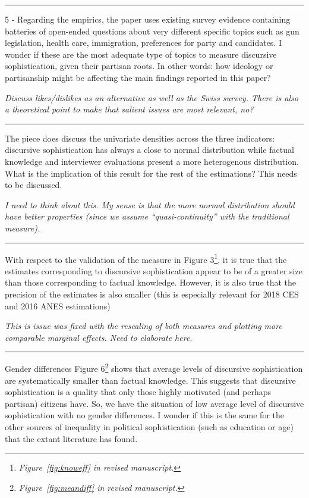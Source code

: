 \rule{\linewidth}{.01cm}

5 - Regarding the empirics, the paper uses existing survey evidence containing batteries of open-ended questions about very different specific topics such as gun legislation, health care, immigration, preferences for party and candidates. I wonder if these are the most adequate type of topics to measure discursive sophistication, given their partisan roots. In other words: how ideology or partisanship might be affecting the main findings reported in this paper?

\textit{Discuss likes/dislikes as an alternative as well as the Swiss survey. There is also a theoretical point to make that salient issues are most relevant, no?}


\rule{\linewidth}{.01cm}

The piece does discuss the univariate densities across the three indicators: discursive sophistication has always a close to normal distribution while factual knowledge and interviewer evaluations present a more heterogenous distribution. What is the implication of this result for the rest of the estimations? This needs to be discussed.

\textit{I need to think about this. My sense is that the more normal distribution should have better properties (since we assume ``quasi-continuity'' with the traditional measure).}


\rule{\linewidth}{.01cm}

With respect to the validation of the measure in Figure 3\footnote{\textit{Figure~\ref{fig:knoweff} in revised manuscript.}}, it is true that the estimates corresponding to discursive sophistication appear to be of a greater size than those corresponding to factual knowledge. However, it is also true that the precision of the estimates is also smaller (this is especially relevant for 2018 CES and 2016 ANES estimations)

\textit{This is issue was fixed with the rescaling of both measures and plotting more comparable marginal effects. Need to elaborate here.}


\rule{\linewidth}{.01cm}

Gender differences Figure 6\footnote{\textit{Figure~\ref{fig:meandiff} in revised manuscript.}} shows that average levels of discursive sophistication are systematically smaller than factual knowledge. This suggests that discursive sophistication is a quality that only those highly motivated (and perhaps partisan) citizens have. So, we have the situation of low average level of discursive sophistication with no gender differences. I wonder if this is the same for the other sources of inequality in political sophistication (such as education or age) that the extant literature has found.

